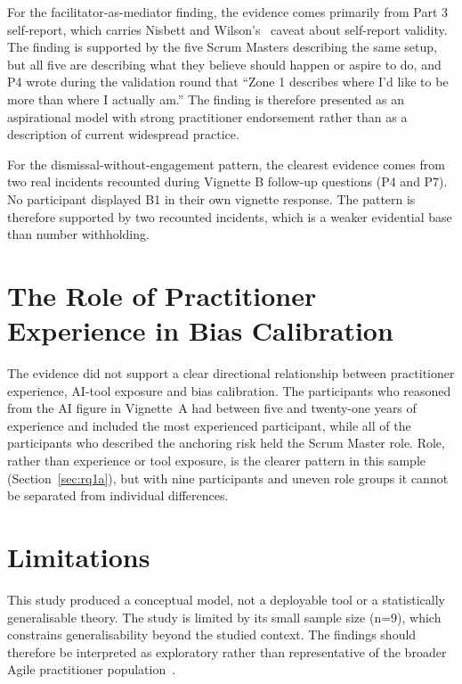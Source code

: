 \documentclass[a4paper,twoside]{bth}
\begin{document}
For the facilitator-as-mediator finding, the evidence comes primarily from Part 3 self-report, which carries Nisbett and Wilson's~\cite{nisbett1977telling} caveat about self-report validity. The finding is supported by the five Scrum Masters describing the same setup, but all five are describing what they believe should happen or aspire to do, and P4 wrote during the validation round that ``Zone 1 describes where I'd like to be more than where I actually am.'' The finding is therefore presented as an aspirational model with strong practitioner endorsement rather than as a description of current widespread practice.

For the dismissal-without-engagement pattern, the clearest evidence comes from two real incidents recounted during Vignette B follow-up questions (P4 and P7). No participant displayed B1 in their own vignette response. The pattern is therefore supported by two recounted incidents, which is a weaker evidential base than number withholding.

\section{The Role of Practitioner Experience in Bias Calibration}

The evidence did not support a clear directional relationship between practitioner experience, AI-tool exposure and bias calibration. The participants who reasoned from the AI figure in Vignette~A had between five and twenty-one years of experience and included the most experienced participant, while all of the participants who described the anchoring risk held the Scrum Master role. Role, rather than experience or tool exposure, is the clearer pattern in this sample (Section~\ref{sec:rq1a}), but with nine participants and uneven role groups it cannot be separated from individual differences.

\section{Limitations}
\label{sec:limitations}

This study produced a conceptual model, not a deployable tool or a statistically generalisable theory. The study is limited by its small sample size (n=9), which constrains generalisability beyond the studied context. The findings should therefore be interpreted as exploratory rather than representative of the broader Agile practitioner population~\cite{creswell2013}.
\end{document}
